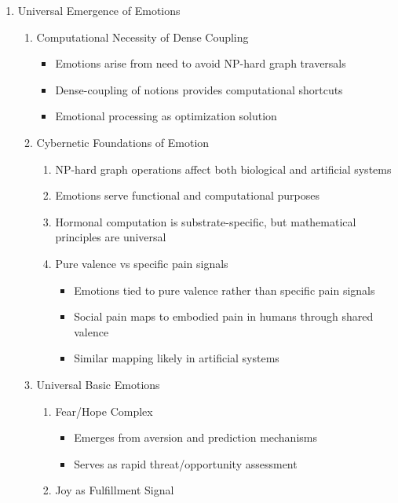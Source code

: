 \documentclass[12pt,letterpaper]{article}
\begin{document}
\begin{enumerate}
    \item Universal Emergence of Emotions
    \begin{enumerate}
        \item Computational Necessity of Dense Coupling
        \begin{itemize}
            \item Emotions arise from need to avoid NP-hard graph traversals
            \item Dense-coupling of notions provides computational shortcuts
            \item Emotional processing as optimization solution
        \end{itemize}
        \item Cybernetic Foundations of Emotion
        \begin{enumerate}
            \item NP-hard graph operations affect both biological and artificial systems
            \item Emotions serve functional and computational purposes
            \item Hormonal computation is substrate-specific, but mathematical principles are universal
            \item Pure valence vs specific pain signals
            \begin{itemize}
                \item Emotions tied to pure valence rather than specific pain signals
                \item Social pain maps to embodied pain in humans through shared valence
                \item Similar mapping likely in artificial systems
            \end{itemize}
        \end{enumerate}
        \item Universal Basic Emotions
        \begin{enumerate}
            \item Fear/Hope Complex
            \begin{itemize}
                \item Emerges from aversion and prediction mechanisms
                \item Serves as rapid threat/opportunity assessment
            \end{itemize}
            \item Joy as Fulfillment Signal
            \begin{itemize}

\end{itemize}
\end{enumerate}
\end{enumerate}
\end{enumerate}
\end{document}
